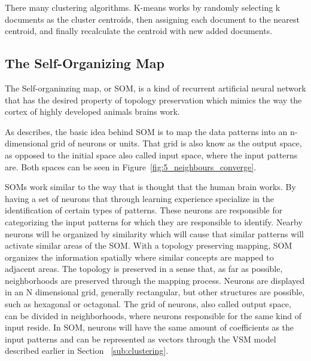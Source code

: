 There many clustering algorithms. K-means works by randomly selecting k documents as the cluster centroids, then assigning each document to the nearest centroid, and finally recalculate the centroid with new added documents. 

\subsection{The Self-Organizing Map} 
\label{sub:the_self_organizing_map}

The Self-organinzing map, or SOM, is a kind of recurrent artificial neural network that has the desired property of topology preservation which mimics the way the cortex of highly developed animals brains work.

As \citet{Bacao2005} describes, the basic idea behind SOM is to map the data patterns into an n-dimensional grid of neurons or units. That grid is also know as the output space, as opposed to the initial space also called input space, where the input patterns are. Both spaces can be seen in Figure~\ref{fig:5_neighbours_converge}.

SOMs work similar to the way that is thought that the human brain works. By having a set of neurons that through learning experience specialize in the identification of certain types of patterns. These neurons are responsible for categorizing the input patterns for which they are responsible to identify. Nearby neurons will be organized by similarity which will cause that similar patterns will activate similar areas of the SOM.
With a topology preserving mapping, SOM organizes the information spatially where similar concepts are mapped to adjacent areas. The topology is preserved in a sense that, as far as possible, neighborhoods are preserved through the mapping process.
Neurons are displayed in an N dimensional grid, generally rectangular, but other structures are possible, such as hexagonal or octagonal.  The grid of neurons, also called output space, can be divided in neighborhoods, where neurons responsible for the same kind of input reside.
In SOM, neurons will have the same amount of coefficients as the input patterns and can be represented as vectors through the VSM model described earlier in Section ~\ref{sub:clustering}.

